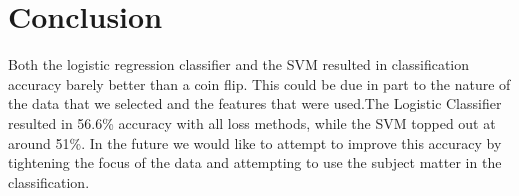 \documentclass{article}
\begin{document}
\section{Conclusion}
Both the logistic regression classifier and the SVM resulted in classification accuracy barely better than a coin flip. This could be due in part to the nature of the data that we selected and the features that were used.The Logistic Classifier resulted in 56.6\% accuracy with all loss methods, while the SVM topped out at around 51\%. In the future we would like to attempt to improve this accuracy by tightening the focus of the data and attempting to use the subject matter in the classification. 




\nocite{langley00}



\end{document}
